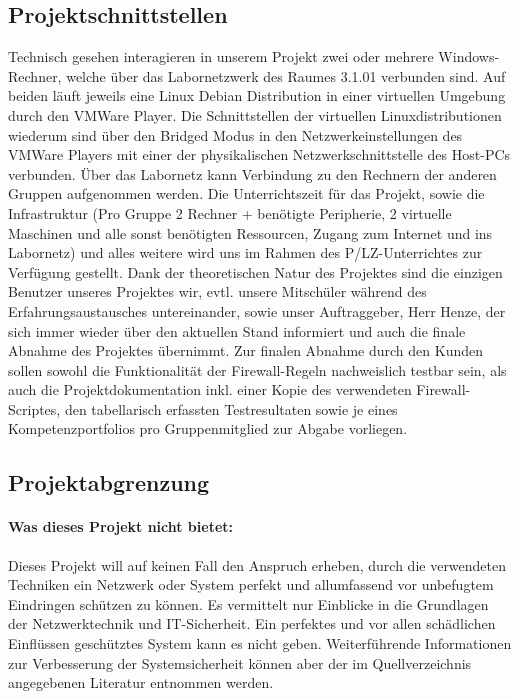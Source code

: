 \subsection{Projektschnittstellen} 
\label{sec:Projektschnittstellen}
Technisch gesehen interagieren in unserem Projekt zwei oder mehrere Windows-Rechner, welche über das Labornetzwerk des Raumes 3.1.01 verbunden sind. Auf beiden läuft jeweils eine Linux Debian Distribution in einer virtuellen Umgebung durch den VMWare Player. Die Schnittstellen der virtuellen Linuxdistributionen wiederum sind über den Bridged Modus in den Netzwerkeinstellungen des VMWare Players mit einer der physikalischen Netzwerkschnittstelle des Host-\ac{PC}s verbunden. Über das Labornetz kann Verbindung zu den Rechnern der anderen Gruppen aufgenommen werden.
Die Unterrichtszeit für das Projekt, sowie die Infrastruktur (Pro Gruppe 2 Rechner + benötigte Peripherie, 2 virtuelle Maschinen und alle sonst benötigten Ressourcen, Zugang zum Internet und ins Labornetz) und alles weitere wird uns im Rahmen des \ac{P/LZ}-Unterrichtes zur Verfügung gestellt.
Dank der theoretischen Natur des Projektes sind die einzigen Benutzer unseres Projektes wir, evtl. unsere Mitschüler während des Erfahrungsaustausches untereinander, sowie unser Auftraggeber, Herr Henze, der sich immer wieder über den aktuellen Stand informiert und auch die finale Abnahme des Projektes übernimmt. 
Zur finalen Abnahme durch den Kunden sollen sowohl die Funktionalität der Firewall-Regeln nachweislich testbar sein, als auch die Projektdokumentation inkl. einer Kopie des verwendeten Firewall-Scriptes, den tabellarisch erfassten Testresultaten sowie je eines Kompetenzportfolios pro Gruppenmitglied zur Abgabe vorliegen.

\subsection{Projektabgrenzung} 
\label{sec:Projektabgrenzung}

\paragraph*{Was dieses Projekt nicht bietet: } Dieses Projekt will auf keinen Fall den Anspruch erheben, durch die verwendeten Techniken ein Netzwerk oder System perfekt und allumfassend vor unbefugtem Eindringen schützen zu können. Es vermittelt nur Einblicke in die Grundlagen der Netzwerktechnik und \ac{IT}-Sicherheit. Ein perfektes und vor allen schädlichen Einflüssen geschütztes System kann es nicht geben. Weiterführende Informationen zur Verbesserung der Systemsicherheit können aber der im Quellverzeichnis angegebenen Literatur entnommen werden.